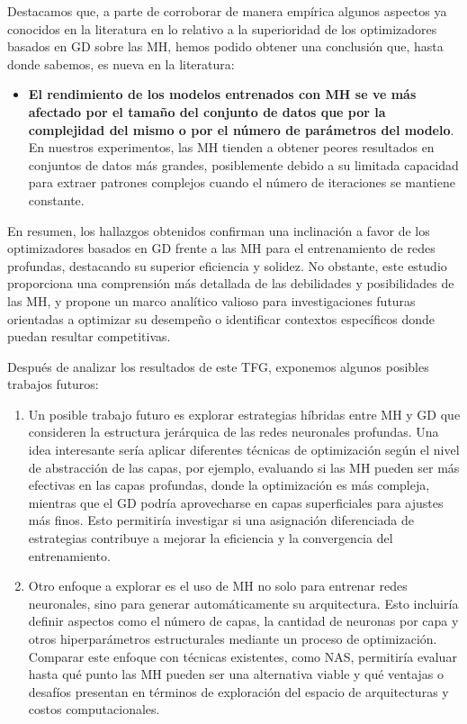 Destacamos que, a parte de corroborar de manera empírica algunos aspectos ya conocidos en la literatura en lo relativo a la superioridad de los optimizadores basados en GD sobre las MH, hemos podido obtener una conclusión que, hasta donde sabemos, es nueva en la literatura:

\begin{itemize}

\item \textbf{El rendimiento de los modelos entrenados con MH se ve más afectado por el tamaño del conjunto de datos que por la complejidad del mismo o por el número de parámetros del modelo}. En nuestros experimentos, las MH tienden a obtener peores resultados en conjuntos de datos más grandes, posiblemente debido a su limitada capacidad para extraer patrones complejos cuando el número de iteraciones se mantiene constante.
\end{itemize}

En resumen, los hallazgos obtenidos confirman una inclinación a favor de los optimizadores basados en GD frente a las MH para el entrenamiento de redes profundas, destacando su superior eficiencia y solidez. No obstante, este estudio proporciona una comprensión más detallada de las debilidades y posibilidades de las MH, y propone un marco analítico valioso para investigaciones futuras orientadas a optimizar su desempeño o identificar contextos específicos donde puedan resultar competitivas.

Después de analizar los resultados de este TFG, exponemos algunos posibles trabajos futuros:

\begin{enumerate}
	\item Un posible trabajo futuro es explorar estrategias híbridas entre MH y GD que consideren la estructura jerárquica de las redes neuronales profundas. Una idea interesante sería aplicar diferentes técnicas de optimización según el nivel de abstracción de las capas, por ejemplo, evaluando si las MH pueden ser más efectivas en las capas profundas, donde la optimización es más compleja, mientras que el GD podría aprovecharse en capas superficiales para ajustes más finos. Esto permitiría investigar si una asignación diferenciada de estrategias contribuye a mejorar la eficiencia y la convergencia del entrenamiento.
	
	\item Otro enfoque a explorar es el uso de MH no solo para entrenar redes neuronales, sino para generar automáticamente su arquitectura. Esto incluiría definir aspectos como el número de capas, la cantidad de neuronas por capa y otros hiperparámetros estructurales mediante un proceso de optimización. Comparar este enfoque con técnicas existentes, como NAS, permitiría evaluar hasta qué punto las MH pueden ser una alternativa viable y qué ventajas o desafíos presentan en términos de exploración del espacio de arquitecturas y costos computacionales.
\end{enumerate}


